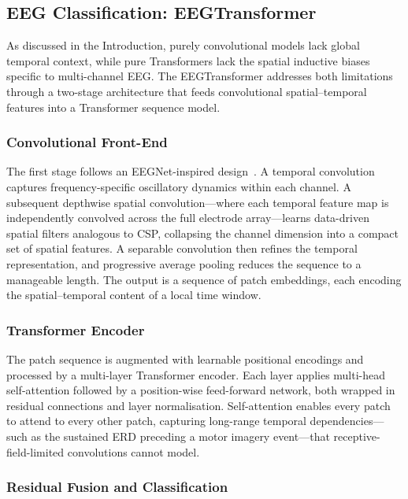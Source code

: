 \documentclass[12pt, a4paper]{article}
\begin{document}
\subsection{EEG Classification: EEGTransformer}

As discussed in the Introduction, purely convolutional models lack global temporal context, while pure Transformers lack the spatial inductive biases specific to multi-channel EEG. The EEGTransformer addresses both limitations through a two-stage architecture that feeds convolutional spatial--temporal features into a Transformer sequence model.

\subsubsection{Convolutional Front-End}

The first stage follows an EEGNet-inspired design~\cite{lawhern2018eegnet}. A temporal convolution captures frequency-specific oscillatory dynamics within each channel. A subsequent depthwise spatial convolution---where each temporal feature map is independently convolved across the full electrode array---learns data-driven spatial filters analogous to CSP, collapsing the channel dimension into a compact set of spatial features. A separable convolution then refines the temporal representation, and progressive average pooling reduces the sequence to a manageable length. The output is a sequence of patch embeddings, each encoding the spatial--temporal content of a local time window.

\subsubsection{Transformer Encoder}

The patch sequence is augmented with learnable positional encodings and processed by a multi-layer Transformer encoder. Each layer applies multi-head self-attention followed by a position-wise feed-forward network, both wrapped in residual connections and layer normalisation. Self-attention enables every patch to attend to every other patch, capturing long-range temporal dependencies---such as the sustained ERD preceding a motor imagery event---that receptive-field-limited convolutions cannot model.

\subsubsection{Residual Fusion and Classification}
\end{document}
